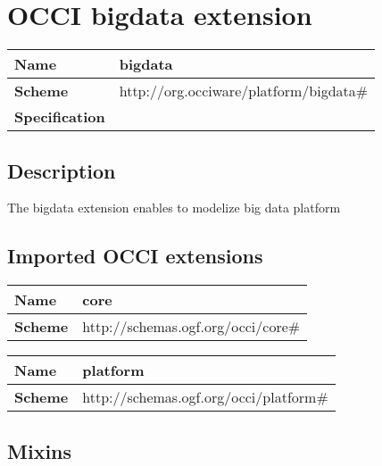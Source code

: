\section{OCCI bigdata extension}
\begin{center}
\begin{tabular}{|l|l|}
  \hline
  \textbf{Name} & bigdata \\
  \hline  
  \textbf{Scheme} & http://org.occiware/platform/bigdata\# \\
  \hline
  \textbf{Specification} &  \\
  \hline
\end{tabular}
\end{center}

\subsection{Description}
The bigdata extension enables to modelize big data platform
\subsection{Imported OCCI extensions}

\begin{center} 
\begin{tabular}{|l|l|}
  \hline
  \textbf{Name} & core \\
  \hline  
  \textbf{Scheme} & http://schemas.ogf.org/occi/core\# \\
  \hline
\end{tabular}
\end{center}
\begin{center} 
\begin{tabular}{|l|l|}
  \hline
  \textbf{Name} & platform \\
  \hline  
  \textbf{Scheme} & http://schemas.ogf.org/occi/platform\# \\
  \hline
\end{tabular}
\end{center}


\subsection{Mixins}

